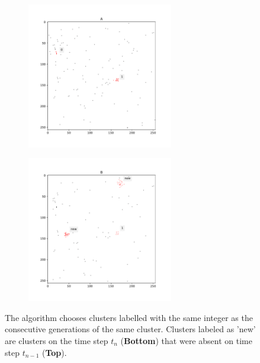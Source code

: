 \begin{figure}[H]
\centering
\begin{subfigure}[H]{\textwidth}
    \centering
\includegraphics[width=0.7\textwidth]{figures/chapter4/velopix_clusters/matching_A.pdf}
\end{subfigure}

\begin{subfigure}[H]{\textwidth}
    \centering
\includegraphics[width=0.7\textwidth]{figures/chapter4/velopix_clusters/matching_B.pdf}
\end{subfigure}
\caption{The algorithm chooses clusters labelled with the same integer as the consecutive generations of the same cluster. Clusters labeled as 'new' are clusters on the time step $t_{n}$ (\textbf{Bottom}) that were absent on time step $t_{n-1}$ (\textbf{Top}).}
\label{fig:fin_clus}
\end{figure}

